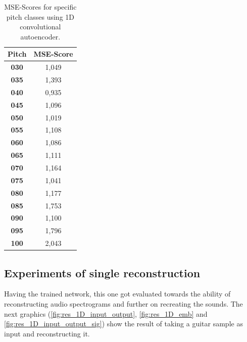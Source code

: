 \begin{table}[htb!]
    \centering
    \begin{tabular}{|c|c|}
        \hline
         \textbf{Pitch} & \textbf{MSE-Score} \\
         \hline
         \textbf{030} & 1,049\\
         \hline
         \textbf{035} & 1,393\\
         \hline
         \textbf{040} & 0,935\\
         \hline
         \textbf{045} & 1,096\\
         \hline
         \textbf{050} & 1,019\\
         \hline
         \textbf{055} & 1,108\\
         \hline
         \textbf{060} & 1,086\\
         \hline
         \textbf{065} & 1,111\\
         \hline
         \textbf{070} & 1,164\\
         \hline
         \textbf{075} & 1,041\\
         \hline
         \textbf{080} & 1,177\\
         \hline
         \textbf{085} & 1,753\\
         \hline
         \textbf{090} & 1,100\\
         \hline
         \textbf{095} & 1,796\\
         \hline
         \textbf{100} & 2,043\\
         \hline
    \end{tabular}
    \caption{MSE-Scores for specific pitch classes using 1D convolutional autoencoder.}
    \label{tab:res_scores_1D_pitch}
\end{table}

\subsection{Experiments of single reconstruction}
Having the trained network, this one got evaluated towards the ability of reconstructing audio spectrograms and further on recreating the sounds. The next graphics (\ref{fig:res_1D_input_output}, \ref{fig:res_1D_emb} and \ref{fig:res_1D_input_output_sig}) show the result of taking a guitar sample as input and reconstructing it. 

